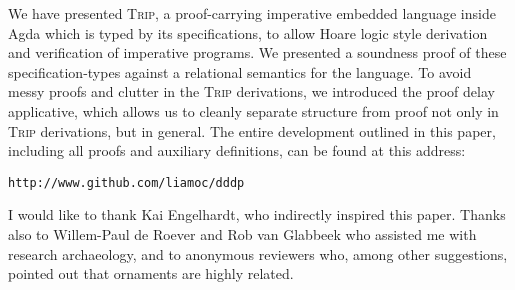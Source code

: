 \documentclass[sigplan]{acmart}%
\begin{document}
We have presented \textsc{Trip}, a proof-carrying imperative embedded
language inside Agda which is typed by its specifications, to allow 
Hoare logic style derivation and verification of imperative programs.
We presented a soundness proof of these specification-types against 
a relational semantics for the language. To avoid messy proofs and 
clutter in the \textsc{Trip} derivations, we introduced the proof delay 
applicative, which allows us to cleanly separate structure from proof 
not only in \textsc{Trip} derivations, but in general. 
The entire development outlined in this paper, including all proofs 
and auxiliary definitions, can be found at this address: \nopagebreak
\begin{center}
\texttt{http://www.github.com/liamoc/dddp}
\end{center}

\begin{acks}                            %
I would like to thank Kai Engelhardt, who
indirectly inspired this paper. Thanks also to Willem-Paul de Roever and Rob van Glabbeek
who assisted me with research archaeology, and to anonymous reviewers who, among other suggestions, pointed out that 
ornaments are highly related.
\end{acks}





%
\end{document}
